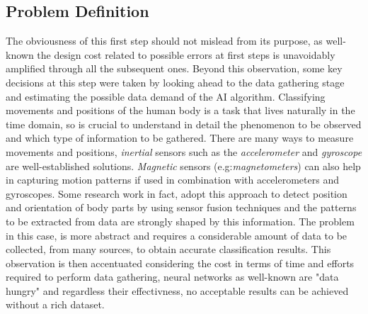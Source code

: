 \subsection{Problem Definition}
The obviousness of this first step should not mislead from its purpose, as well-known the design cost related to possible errors at first steps is unavoidably amplified through all the subsequent ones. Beyond this observation, some key decisions at this step were taken by looking ahead to the data gathering stage and estimating the possible data demand of the AI algorithm. Classifying movements and positions of the human body is a task that lives naturally in the time domain, so is crucial to understand in detail the phenomenon to be observed and which type of information to be gathered.\newline
There are many ways to measure movements and positions, \textit{inertial} sensors such as the \textit{accelerometer} and \textit{gyroscope} are well-established solutions. \textit{Magnetic} sensors (e.g:\textit{magnetometers}) can also help in capturing motion patterns if used in combination with accelerometers and gyroscopes. Some research work in fact, adopt this approach to detect position and orientation of body parts by using sensor fusion techniques \cite{navamelendez2016} and the patterns to be extracted from data are strongly shaped by this information. The problem in this case, is more abstract and requires a considerable amount of data to be collected, from many sources, to obtain accurate classification results. This observation is then accentuated considering the cost in terms of time and efforts required to perform data gathering, neural networks as well-known are "data hungry" and regardless their effectivness, no acceptable results can be achieved without a rich dataset. \newline

